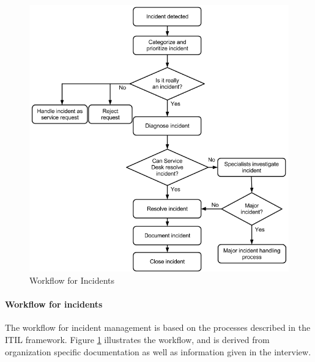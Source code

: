 \begin{figure}[H]
\begin{center}
\includegraphics[scale=0.515]{workflowcaseC.png}
\caption[Workflow for Incidents, Case C]{Workflow for Incidents}
\label{fig:workflowcaseC}
\end{center}
\end{figure}
\pagebreak
\paragraph{Workflow for incidents}
The workflow for incident management is based on the processes described in the ITIL framework. Figure \ref{fig:workflowcaseC} illustrates the workflow, and is derived from organization specific documentation as well as information given in the interview. 

